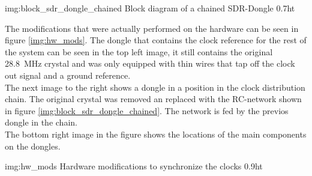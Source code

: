              {img:block_sdr_dongle_chained}
             {Block diagram of a chained SDR-Dongle}
             {0.7}{ht}

The modifications that were actually performed on the
hardware can be seen in figure \ref{img:hw_mods}.
The dongle that contains the clock reference for
the rest of the system can be seen in the top left
image, it still contains the original
\SI{28.8}{\mega\hertz} crystal and was only equipped
with thin wires that tap off the clock out signal
and a ground reference. \\

The next image to the right shows a dongle
in a position in the clock distribution chain.
The original crystal was removed an replaced with
the RC-network shown in figure \ref{img:block_sdr_dongle_chained}.
The network is fed by the previos dongle in the chain. \\

The bottom right image in the figure shows the
locations of the main components on the dongles.

             {img:hw_mods}
             {Hardware modifications to synchronize the clocks}
             {0.9}{ht}
